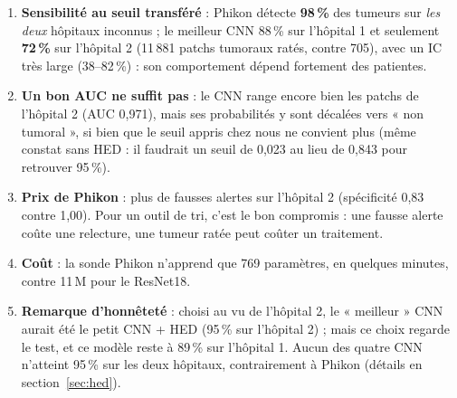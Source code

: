 \documentclass[11pt,a4paper]{article}
\begin{document}
\begin{constat}
\begin{enumerate}
  \item \textbf{Sensibilité au seuil transféré} : Phikon détecte \textbf{98\,\%} des tumeurs sur \emph{les deux} hôpitaux inconnus ;
        le meilleur CNN 88\,\% sur l'hôpital 1 et seulement \textbf{72\,\%} sur l'hôpital 2 (11\,881 patchs tumoraux ratés, contre
        705), avec un IC très large (38–82\,\%) : son comportement dépend fortement des patientes.
  \item \textbf{Un bon AUC ne suffit pas} : le CNN range encore bien les patchs de l'hôpital 2 (AUC 0,971), mais ses probabilités y
        sont décalées vers « non tumoral », si bien que le seuil appris chez nous ne convient plus (même constat sans HED : il
        faudrait un seuil de 0,023 au lieu de 0,843 pour retrouver 95\,\%).
  \item \textbf{Prix de Phikon} : plus de fausses alertes sur l'hôpital 2 (spécificité 0,83 contre 1,00). Pour un outil de tri, c'est
        le bon compromis : une fausse alerte coûte une relecture, une tumeur ratée peut coûter un traitement.
  \item \textbf{Coût} : la sonde Phikon n'apprend que 769 paramètres, en quelques minutes, contre 11\,M pour le ResNet18.
  \item \textbf{Remarque d'honnêteté} : choisi au vu de l'hôpital 2, le « meilleur » CNN aurait été le petit CNN + HED (95\,\% sur
        l'hôpital 2) ; mais ce choix regarde le test, et ce modèle reste à 89\,\% sur l'hôpital 1. Aucun des quatre CNN n'atteint
        95\,\% sur les deux hôpitaux, contrairement à Phikon (détails en section~\ref{sec:hed}).
\end{enumerate}
\end{constat}
\end{document}
